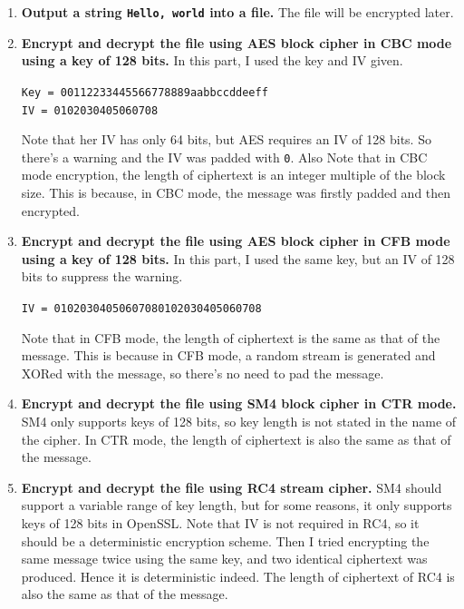 \begin{enumerate}[label=(\arabic*)]
\item {
    \textbf{Output a string \texttt{Hello, world} into a file.} 
    The file will be encrypted later.
}
\item {
    \textbf{Encrypt and decrypt the file using AES block cipher in CBC mode using a key of 128 bits.} 
    In this part, I used the key and IV given.
    \begin{center}
        \texttt{Key = 00112233445566778889aabbccddeeff} \\
        \texttt{IV  = 0102030405060708}
    \end{center}
    Note that her IV has only 64 bits, but AES requires an IV of 128 bits. So there's a warning and the IV was padded with \texttt{0}. 
    Also Note that in CBC mode encryption, the length of ciphertext is an integer multiple of the block size. This is because, in CBC mode, the message was firstly padded and then encrypted.
}
\item {
    \textbf{Encrypt and decrypt the file using AES block cipher in CFB mode using a key of 128 bits. }
    In this part, I used the same key, but an IV of 128 bits to suppress the warning.
    \begin{center}
        \texttt{IV  = 01020304050607080102030405060708}
    \end{center}
    Note that in CFB mode, the length of ciphertext is the same as that of the message. This is because in CFB mode, a random stream is generated and XORed with the message, so there's no need to pad the message.   
}
\item {
    \textbf{Encrypt and decrypt the file using SM4 block cipher in CTR mode.}
    SM4 only supports keys of 128 bits, so key length is not stated in the name of the cipher.
    In CTR mode, the length of ciphertext is also the same as that of the message.
}
\item {
    \textbf{Encrypt and decrypt the file using RC4 stream cipher.}
    SM4 should support a variable range of key length, but for some reasons, it only supports keys of 128 bits in OpenSSL.
    Note that IV is not required in RC4, so it should be a deterministic encryption scheme. Then I tried encrypting the same message twice using the same key, and two identical ciphertext was produced. Hence it is deterministic indeed.
    The length of ciphertext of RC4 is also the same as that of the message.
}
\end{enumerate}

